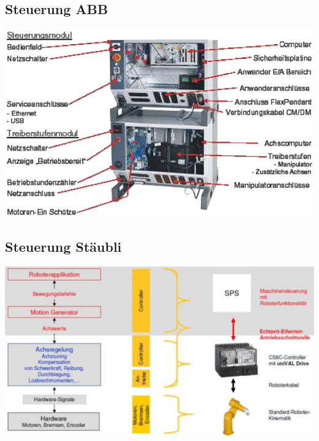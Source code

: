 \enlargethispage{4\baselineskip}
\begin{minipage}{0.5\linewidth}
    \subsection{Steuerung ABB}
    \includegraphics[width=\linewidth]{./bilder/SteuerungABB}
\end{minipage}
\begin{minipage}{0.5\linewidth}
    \subsection{Steuerung Stäubli}
    \includegraphics[width=\linewidth]{./bilder/SteuerungStauebli}
\end{minipage}